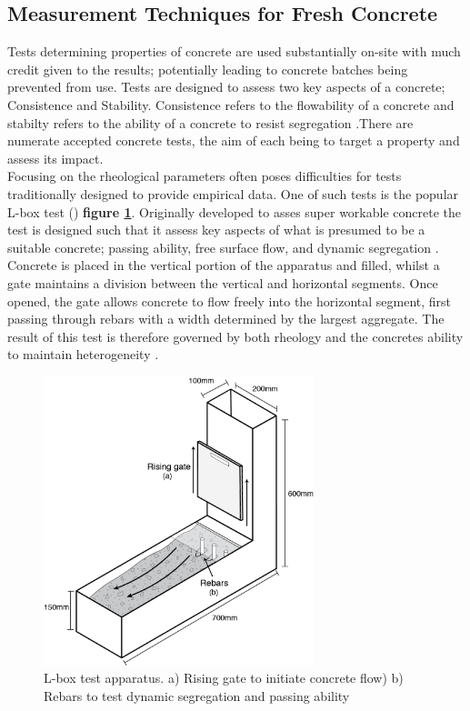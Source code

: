 \subsection{Measurement Techniques for Fresh Concrete}
Tests determining properties of concrete are used substantially on-site with much credit given to the results; potentially leading to concrete batches being prevented from use. Tests are designed to assess two key aspects of a concrete; Consistence and Stability. Consistence refers to the flowability of a concrete and stabilty refers to the ability of a concrete to resist segregation \citep{Sperwall}.There are numerate accepted concrete tests, the aim of each being to target a  property and assess its impact.\\
\newline
\noindent
Focusing on the rheological parameters often poses difficulties for tests traditionally designed to provide empirical data. One of such tests is the popular L-box test (\citeauthor{BS1235010}) {\bfseries figure \ref{fig:lbox}}. Originally developed to asses super workable concrete \citep{lboxaus} the test is designed such that it assess key aspects of what is presumed to be a suitable concrete; passing ability, free surface flow, and dynamic segregation \citep{NGUYEN06}.\\
\newline
\noindent
Concrete is placed in the vertical portion of the apparatus and filled, whilst a gate maintains a division between the vertical and horizontal segments. Once opened, the gate allows concrete to flow freely into the horizontal segment, first passing through rebars with a width determined by the largest aggregate. The result of this test is therefore governed by both rheology and the concretes ability to maintain heterogeneity \citep{karsten}.\\
\begin{figure}[H]
\centering
\includegraphics[width=0.7\textwidth]{lbox.png}
\caption{\label{fig:lbox} L-box test apparatus. a) Rising gate to initiate concrete flow) b) Rebars to test dynamic segregation and passing ability}
\end{figure}
